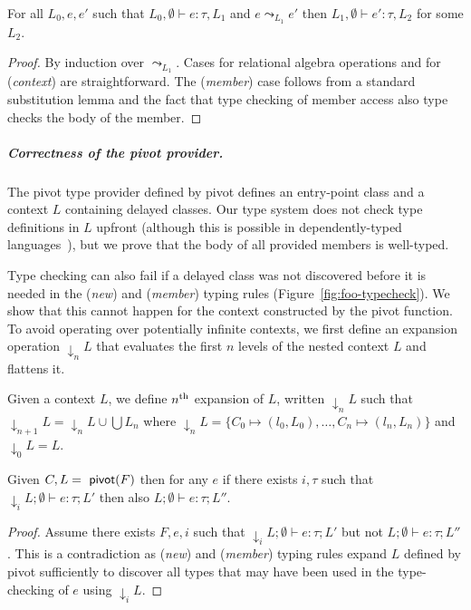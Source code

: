 \documentclass[a4paper,UKenglish]{lipics-v2016}
\theoremstyle{plain}
\theoremstyle{definition}
\newcommand{\ident}[1]{\textnormal{\sffamily #1}}
\begin{document}
\begin{lemma}
\label{thm:foo-pres}
For all $L_0, e, e'$ such that $L_0, \emptyset \vdash e : \tau, L_1$ and $e\leadsto_{L_1} e'$ then
$L_1, \emptyset \vdash e' : \tau, L_2$ for some $L_2$.
\end{lemma}
\begin{proof}
By induction over $\leadsto_{L_1}$. Cases for relational algebra operations and for (\emph{context})
are straightforward. The (\emph{member}) case follows from a standard substitution lemma and the 
fact that type checking of member access also type checks the body of the member.
\end{proof}

\subparagraph{Correctness of the pivot provider.} 
The pivot type provider defined by \ident{pivot} defines an entry-point class and a context $L$ 
containing delayed classes. Our type system does not check type definitions in $L$ upfront
(although this is possible in dependently-typed languages~\cite{idris-tp}), but 
we prove that the body of all provided members is well-typed. 

Type checking can also fail if a delayed class was not discovered before it is needed in the (\emph{new}) and (\emph{member}) 
typing rules (Figure~\ref{fig:foo-typecheck}). We show that this cannot happen for the context
constructed by the \ident{pivot} function. To avoid operating over potentially infinite contexts,
we first define an expansion operation $\downarrow_n L$ that evaluates the first $n$ levels of the 
nested context $L$ and flattens it.

\begin{definition}[Expansion]
\label{thm:pivot-well}
Given a context $L$, we define $n^{\textnormal{th}}$ expansion of $L$, written 
$\downarrow_n L$ such that
$\downarrow_{n+1} L = \downarrow_{n} L \cup \bigcup L_n$ where $\downarrow_{n} L = \{ C_0\mapsto(l_0, L_0),\ldots,C_n\mapsto(l_n, L_n) \}$
and $\downarrow_0 L = L$.
\end{definition}

\begin{theorem}
\label{thm:pivot-lazy}
Given $C,L=\ident{pivot}(F)$ then for any $e$ if there exists $i, \tau$ such that 
$\downarrow_i L; \emptyset \vdash e : \tau; L'$ then also
$L; \emptyset \vdash e : \tau; L''$.
\end{theorem}
\begin{proof}
Assume there exists $F,e,i$ such that $\downarrow_i L; \emptyset \vdash e : \tau; L'$ but
not $L; \emptyset \vdash e : \tau; L''$. This is a contradiction as (\emph{new}) and (\emph{member})
typing rules expand $L$ defined by \ident{pivot} sufficiently to discover all types that may have
been used in the type-checking of $e$ using $\downarrow_i L$.
\end{proof}
\end{document}
